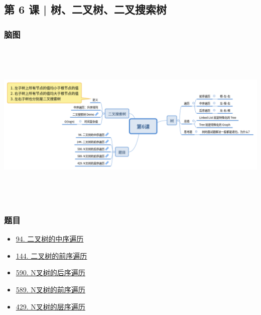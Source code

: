 \subsection{第 6 课 | 树、二叉树、二叉搜索树}

\subsubsection{脑图}

\includegraphics[width=170mm,height=80mm]{images/第6课.png}

\subsubsection{题目}

\begin{itemize}
  \item \hyperref[leetcode:94]{94. 二叉树的中序遍历}
  \item \hyperref[leetcode:144]{144. 二叉树的前序遍历}
  \item \hyperref[leetcode:590]{590. N叉树的后序遍历}
  \item \hyperref[leetcode:589]{589. N叉树的前序遍历}
  \item \hyperref[leetcode:429]{429. N叉树的层序遍历}
\end{itemize}

